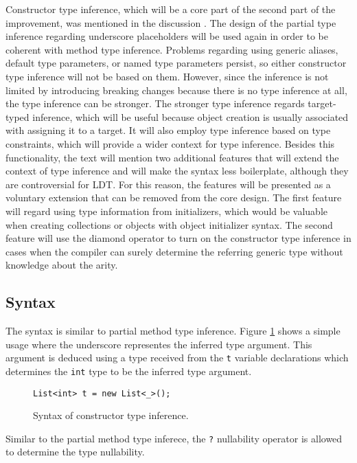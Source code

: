 Constructor type inference, which will be a core part of the second part of the improvement, was mentioned in the discussion \cite{online:CtorTInf}. 
The design of the partial type inference regarding underscore placeholders will be used again in order to be coherent with method type inference. 
Problems regarding using generic aliases, default type parameters, or named type parameters persist, so either constructor type inference will not be based on them. 
However, since the inference is not limited by introducing breaking changes because there is no type inference at all, the type inference can be stronger. 
The stronger type inference regards target-typed inference, which will be useful because object creation is usually associated with assigning it to a target. 
It will also employ type inference based on type constraints, which will provide a wider context for type inference. 
Besides this functionality, the text will mention two additional features that will extend the context of type inference and will make the syntax less boilerplate, although they are controversial for \ac{LDT}. 
For this reason, the features will be presented as a voluntary extension that can be removed from the core design. 
The first feature will regard using type information from initializers, which would be valuable when creating collections or objects with object initializer syntax. 
The second feature will use the diamond operator to turn on the constructor type inference in cases when the compiler can surely determine the referring generic type without knowledge about the arity.

\subsection{Syntax}

The syntax is similar to partial method type inference.
Figure \ref{img56:constructorTypeInferenceExample} shows a simple usage where the underscore representes the inferred type argument.
This argument is deduced using a type received from the \texttt{t} variable declarations which determines the \texttt{int} type to be the inferred type argument.
\begin{figure}[h!]
\begin{lstlisting}[style=csharp, mathescape=true]
List<int> t = new List<_>();
\end{lstlisting}
\caption{Syntax of constructor type inference.}
\label{img56:constructorTypeInferenceExample}
\end{figure}
\par
Similar to the partial method type inferece, the \texttt{?} nullability operator is allowed to determine the type nullability.

